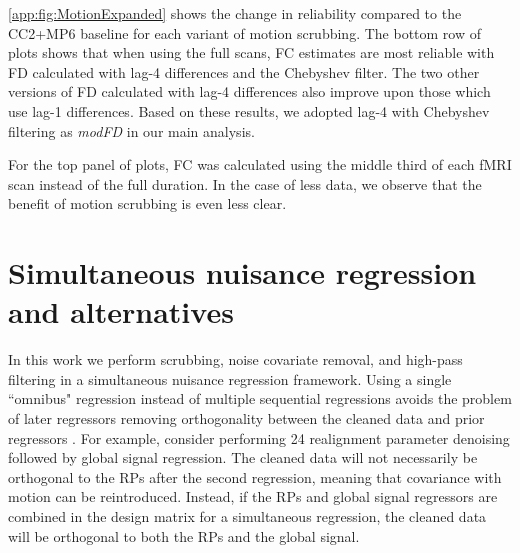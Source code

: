 \documentclass{article}
\begin{document}
\autoref{app:fig:MotionExpanded} shows the change in reliability compared to the CC2+MP6 baseline for each variant of motion scrubbing. The bottom row of plots shows that when using the full scans, FC estimates are most reliable with FD calculated with lag-4 differences and the Chebyshev filter. The two other versions of FD calculated with lag-4 differences also improve upon those which use lag-1 differences. Based on these results, we adopted lag-4 with Chebyshev filtering as \textit{modFD} in our main analysis.

For the top panel of plots, FC was calculated using the middle third of each fMRI scan instead of the full duration. In the case of less data, we observe that the benefit of motion scrubbing is even less clear.


\newpage
\section{Simultaneous nuisance regression and alternatives}
\label{app:nreg_framework}

In this work we perform scrubbing, noise covariate removal, and high-pass filtering in a simultaneous nuisance regression framework. Using a single ``omnibus" regression instead of multiple sequential regressions avoids the problem of later regressors removing orthogonality between the cleaned data and prior regressors \citep{lindquistModularPreprocessingPipelines2019}. For example, consider performing 24 realignment parameter denoising followed by global signal regression. The cleaned data will not necessarily be orthogonal to the RPs after the second regression, meaning that covariance with motion can be reintroduced. Instead, if the RPs and global signal regressors are combined in the design matrix for a simultaneous regression, the cleaned data will be orthogonal to both the RPs and the global signal.
\end{document}
